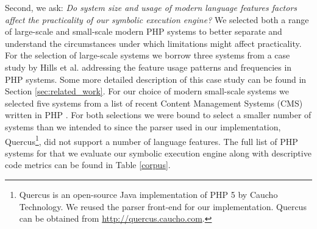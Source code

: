 \documentclass[sigconf]{acmart}
\renewcommand{\sf}[1]{\textsf{#1}}
\begin{document}
Second, we ask: \textit{Do system size and usage of modern language features
factors affect the practicality of our symbolic execution engine?} We
selected both a range of large-scale and small-scale modern PHP systems to
better separate and understand the circumstances under which limitations might affect practicality. For the selection of large-scale systems
we borrow three systems from a case study by Hills et al. \cite{hills2015variable} addressing the
feature usage patterns and frequencies in PHP systems. Some more detailed description of this
case study can be found in Section \ref{sec:related_work}. For our choice of modern small-scale systems we
selected five systems from a list of recent Content Management Systems (CMS) written in PHP \cite{codegeekz}. For both
selections we were bound to select a smaller number of systems than we intended
to since the parser used in our implementation,
\sf{Quercus}\footnote{\sf{Quercus} is an open-source Java implementation of PHP
5 by Caucho Technology. We reused the parser front-end for our implementation.
\sf{Quercus} can be obtained from \url{http://quercus.caucho.com}.}, did not
support a number of language features.
The full list of PHP systems for that we evaluate our symbolic execution engine along with descriptive code metrics can be found in Table \ref{corpus}.


\end{document}
